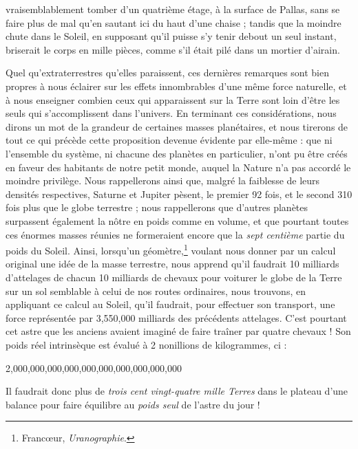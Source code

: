 \documentclass[a4paper, 11pt, oneside, landscape]{article}
\begin{document}
vraisemblablement tomber d'un quatrième étage, à la surface de Pallas, sans se faire plus de mal qu'en sautant ici du haut d'une chaise ; tandis que la moindre chute dans le Soleil, en supposant qu'il puisse s'y tenir debout un seul instant, briserait le corps en mille pièces, comme s'il était pilé dans un mortier d'airain.

Quel qu'extraterrestres qu'elles paraissent, ces dernières remarques sont bien propres à nous éclairer sur les effets innombrables d'une même force naturelle, et à nous enseigner combien ceux qui apparaissent sur la Terre sont loin d'être les seuls qui s'accomplissent dans l'univers. En terminant ces considérations, nous dirons un mot de la grandeur de certaines masses planétaires, et nous tirerons de tout ce qui précède cette proposition devenue évidente par elle-même : que ni l'ensemble du système, ni chacune des planètes en particulier, n'ont pu être créés en faveur des habitants de notre petit monde, auquel la Nature n'a pas accordé le moindre privilège. Nous rappellerons ainsi que, malgré la faiblesse de leurs densités respectives, Saturne et Jupiter pèsent, le premier 92 fois, et le second 310 fois plus que le globe terrestre ; nous rappellerons que d'autres planètes surpassent également la nôtre en poids comme en volume, et que pourtant toutes ces énormes masses réunies ne formeraient encore que la \emph{sept centième} partie du poids du Soleil. Ainsi, lorsqu'un géomètre,\footnote{Francœur, \emph{Uranographie}.} voulant nous donner par un calcul original une idée de la masse terrestre, nous apprend qu'il faudrait 10 milliards d'attelages de chacun 10 milliards de chevaux pour voiturer le globe de la Terre sur un sol semblable à celui de nos routes ordinaires, nous trouvons, en appliquant ce calcul au Soleil, qu'il faudrait, pour effectuer son transport, une force représentée par 3,550,000 milliards des précédents attelages. C'est pourtant cet astre que les anciens avaient imaginé de faire traîner par quatre chevaux ! Son poids réel intrinsèque est évalué à 2 nonillions de kilogrammes, ci :

2,000,000,000,000,000,000,000,000,000,000

Il faudrait donc plus de \emph{trois cent vingt-quatre mille Terres} dans le plateau d'une balance pour faire équilibre au \emph{poids seul} de l'astre du jour !
\end{document}
